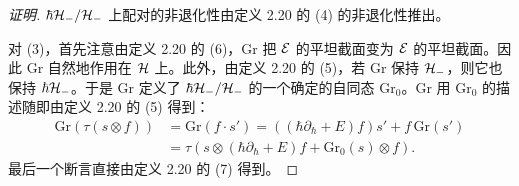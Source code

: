 \begin{proof}[证明]
$\hbar\mathcal{H}_-/\mathcal{H}_-$ 上配对的非退化性由定义 2.20 的 (4) 的非退化性推出。

对 (3)，首先注意由定义 2.20 的 (6)，$\mathrm{Gr}$ 把 $\mathcal{E}$ 的平坦截面变为 $\mathcal{E}$ 的平坦截面。因此 $\mathrm{Gr}$ 自然地作用在 $\mathcal{H}$ 上。此外，由定义 2.20 的 (5)，若 $\mathrm{Gr}$ 保持 $\mathcal{H}_-$，则它也保持 $\hbar\mathcal{H}_-$。于是 $\mathrm{Gr}$ 定义了 $\hbar\mathcal{H}_-/\mathcal{H}_-$ 的一个确定的自同态 $\mathrm{Gr}_0$。$\mathrm{Gr}$ 用 $\mathrm{Gr}_0$ 的描述随即由定义 2.20 的 (5) 得到：
\begin{align*}
\mathrm{Gr}(\tau(s\otimes f)) &= \mathrm{Gr}(f\cdot s')=((\hbar\partial_\hbar+E)f)s'+f\,\mathrm{Gr}(s')\\
&= \tau(s\otimes(\hbar\partial_\hbar+E)f+\mathrm{Gr}_0(s)\otimes f).
\end{align*}
最后一个断言直接由定义 2.20 的 (7) 得到。
\end{proof}

